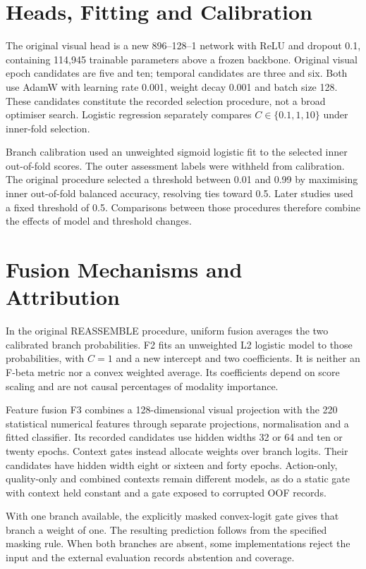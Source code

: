 \section{Heads, Fitting and Calibration}
The original visual head is a new 896--128--1 network with ReLU and dropout 0.1,
containing 114,945 trainable parameters above a frozen backbone. Original visual epoch
candidates are five and ten; temporal candidates are three and six. Both use AdamW with
learning rate 0.001, weight decay 0.001 and batch size 128. These candidates constitute
the recorded selection procedure, not a broad optimiser search. Logistic regression
separately compares $C\in\{0.1,1,10\}$ under inner-fold selection.

Branch calibration used an unweighted sigmoid logistic fit to the selected inner
out-of-fold scores. The outer assessment labels were withheld from calibration. The
original procedure selected a threshold between 0.01 and 0.99 by maximising inner
out-of-fold balanced accuracy, resolving ties toward 0.5. Later studies used a fixed
threshold of 0.5. Comparisons between those procedures therefore combine the effects of
model and threshold changes.

\section{Fusion Mechanisms and Attribution}
In the original REASSEMBLE procedure, uniform fusion averages the two calibrated branch
probabilities. F2 fits an unweighted L2 logistic model to those probabilities, with
$C=1$ and a new intercept and two coefficients. It is neither an F-beta metric nor a
convex weighted average. Its
coefficients depend on score scaling and are not causal percentages of modality
importance.

Feature fusion F3 combines a 128-dimensional visual projection with the 220 statistical
numerical features through separate projections, normalisation and a fitted classifier.
Its recorded candidates use hidden widths 32 or 64 and ten or twenty epochs. Context
gates instead allocate weights over branch logits. Their candidates have hidden width
eight or sixteen and forty epochs. Action-only, quality-only and combined contexts
remain different models, as do a static gate with context held constant and a gate
exposed to corrupted OOF records.

With one branch available, the explicitly masked convex-logit gate gives that branch a
weight of one. The resulting prediction follows from the specified masking rule. When
both branches are absent, some implementations reject the input and the external
evaluation records abstention and coverage.

